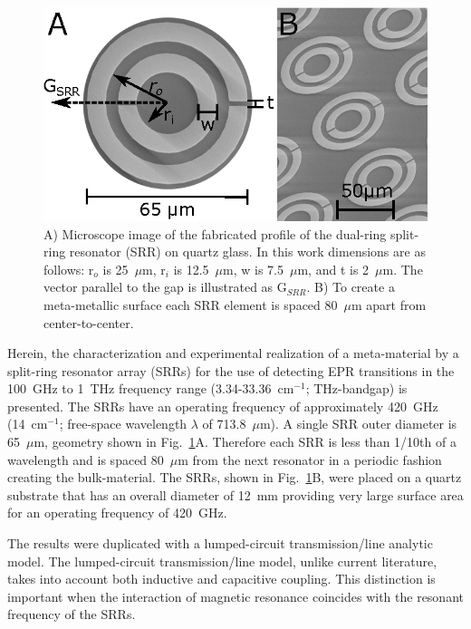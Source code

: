 \begin{figure}[htpb]
\centering
  \includegraphics{Kapitel/Ch3-Images/01-Measurements.eps}%
  \caption[Microscope image of the SRR geometry.]{ A) Microscope image of the fabricated profile of the dual-ring split-ring resonator (SRR) on quartz glass. In this work dimensions are as follows: r$_o$ is 25~$\mu$m, r$_i$ is 12.5~$\mu$m, w is 7.5~$\mu$m, and t is 2~$\mu$m. The vector parallel to the gap is illustrated as G$_{SRR}$. B) To create a meta-metallic surface each SRR element is spaced 80~$\mu$m apart from center-to-center.}
  \label{ch3-fig:sizes}
\end{figure}

Herein, the characterization and experimental realization of a meta-material by a split-ring resonator array (SRRs) for the use of detecting EPR transitions in the 100~GHz to 1~THz frequency range (3.34-33.36~cm$^{-1}$; THz-bandgap) is presented. The SRRs have an operating frequency of approximately 420~GHz (14~cm$^{-1}$; free-space wavelength $\lambda$ of 713.8~$\mu$m). A single SRR outer diameter is 65~$\mu$m, geometry shown in Fig.~\ref{ch3-fig:sizes}A. Therefore each SRR is less than 1/10th of a wavelength and is spaced 80~$\mu$m from the next resonator in a periodic fashion creating the bulk-material. The SRRs, shown in Fig.~\ref{ch3-fig:sizes}B, were placed on a quartz substrate that has an overall diameter of 12~mm providing very large surface area for an operating frequency of 420~GHz.

The results were duplicated with a lumped-circuit transmission\-/line analytic model. The lumped-circuit transmission\-/line model, unlike current literature, takes into account both inductive and capacitive coupling. This distinction is important when the interaction of magnetic resonance coincides with the resonant frequency of the SRRs.

